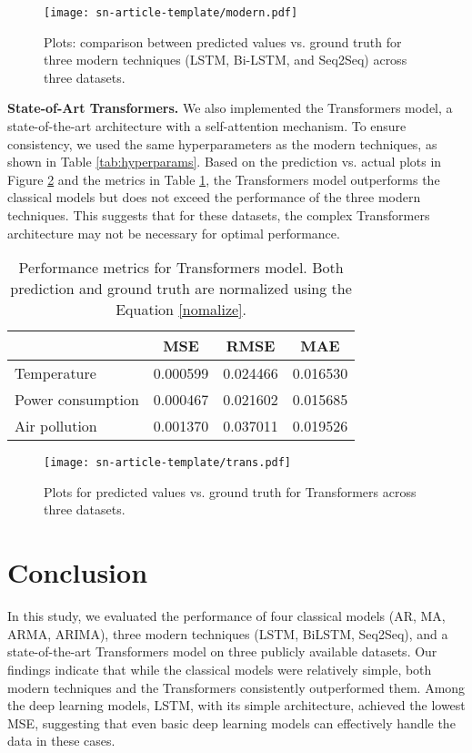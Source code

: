 \documentclass[sn-mathphys-num]{sn-jnl}
\theoremstyle{thmstyleone}%
\theoremstyle{thmstyletwo}%
\theoremstyle{thmstylethree}%
\begin{document}
\begin{figure}[H]
	\begin{center}
		\texttt{[image: sn-article-template/modern.pdf]}
	\end{center}
	\caption{Plots: comparison between predicted values vs. ground truth for three modern techniques (LSTM, Bi-LSTM, and Seq2Seq) across three datasets.}
	\label{fig:modern}
\end{figure}


\textbf{State-of-Art Transformers.} We also implemented the Transformers model, a state-of-the-art architecture with a self-attention mechanism. To ensure consistency, we used the same hyperparameters as the modern techniques, as shown in Table \ref{tab:hyperparams}. Based on the prediction vs. actual plots in Figure \ref{fig:trans} and the metrics in Table \ref{tab:trans_metric}, the Transformers model outperforms the classical models but does not exceed the performance of the three modern techniques. This suggests that for these datasets, the complex Transformers architecture may not be necessary for optimal performance.
\begin{table}[h]
\centering
\begin{tabular}{@{}lccc@{}}
\toprule
\textbf{}               & \textbf{MSE} & \textbf{RMSE} & \textbf{MAE} \\ \midrule
Temperature             & 0.000599     & 0.024466      & 0.016530     \\
Power consumption       & 0.000467     & 0.021602      & 0.015685     \\
Air pollution           & 0.001370     & 0.037011      & 0.019526     \\ \bottomrule
\end{tabular}
\caption{Performance metrics for Transformers model. Both prediction and ground truth are normalized using the Equation \ref{nomalize}.}
\label{tab:trans_metric}
\end{table}
\begin{figure}[H]
	\begin{center}
		\texttt{[image: sn-article-template/trans.pdf]}
	\end{center}
	\caption{Plots for predicted values vs. ground truth for Transformers across three datasets.}
	\label{fig:trans}
\end{figure}

\section{Conclusion}
In this study, we evaluated the performance of four classical models (AR, MA, ARMA, ARIMA), three modern techniques (LSTM, BiLSTM, Seq2Seq), and a state-of-the-art Transformers model on three publicly available datasets. Our findings indicate that while the classical models were relatively simple, both modern techniques and the Transformers consistently outperformed them. Among the deep learning models, LSTM, with its simple architecture, achieved the lowest MSE, suggesting that even basic deep learning models can effectively handle the data in these cases.
\end{document}
